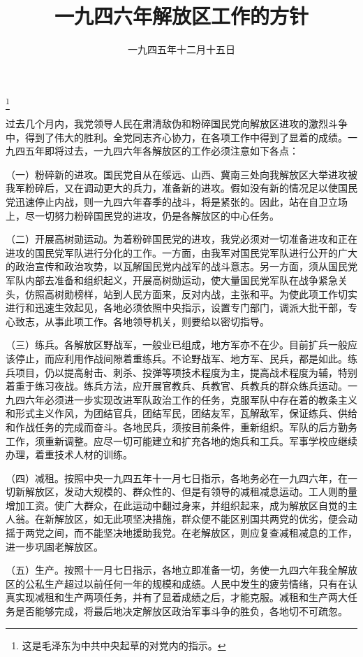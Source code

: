 
\title{一九四六年解放区工作的方针}
\date{一九四五年十二月十五日}
\thanks{这是毛泽东为中共中央起草的对党内的指示。}
\maketitle


过去几个月内，我党领导人民在肃清敌伪和粉碎国民党向解放区进攻的激烈斗争中，得到了伟大的胜利。全党同志齐心协力，在各项工作中得到了显着的成绩。一九四五年即将过去，一九四六年各解放区的工作必须注意如下各点：

（一）粉碎新的进攻。国民党自从在绥远、山西、冀南三处向我解放区大举进攻被我军粉碎后，又在调动更大的兵力，准备新的进攻。假如没有新的情况足以使国民党迅速停止内战，则一九四六年春季的战斗，将是紧张的。因此，站在自卫立场上，尽一切努力粉碎国民党的进攻，仍是各解放区的中心任务。

（二）开展高树勋运动。为着粉碎国民党的进攻，我党必须对一切准备进攻和正在进攻的国民党军队进行分化的工作。一方面，由我军对国民党军队进行公开的广大的政治宣传和政治攻势，以瓦解国民党内战军的战斗意志。另一方面，须从国民党军队内部去准备和组织起义，开展高树勋运动，使大量国民党军队在战争紧急关头，仿照高树勋榜样，站到人民方面来，反对内战，主张和平。为使此项工作切实进行和迅速生效起见，各地必须依照中央指示，设置专门部门，调派大批干部，专心致志，从事此项工作。各地领导机关，则要给以密切指导。

（三）练兵。各解放区野战军，一般业已组成，地方军亦不在少。目前扩兵一般应该停止，而应利用作战间隙着重练兵。不论野战军、地方军、民兵，都是如此。练兵项目，仍以提高射击、刺杀、投弹等项技术程度为主，提高战术程度为辅，特别着重于练习夜战。练兵方法，应开展官教兵、兵教官、兵教兵的群众练兵运动。一九四六年必须进一步实现改进军队政治工作的任务，克服军队中存在着的教条主义和形式主义作风，为团结官兵，团结军民，团结友军，瓦解敌军，保证练兵、供给和作战任务的完成而奋斗。各地民兵，须按目前条件，重新组织。军队的后方勤务工作，须重新调整。应尽一切可能建立和扩充各地的炮兵和工兵。军事学校应继续办理，着重技术人材的训练。

（四）减租。按照中央一九四五年十一月七日指示，各地务必在一九四六年，在一切新解放区，发动大规模的、群众性的、但是有领导的减租减息运动。工人则酌量增加工资。使广大群众，在此运动中翻过身来，并组织起来，成为解放区自觉的主人翁。在新解放区，如无此项坚决措施，群众便不能区别国共两党的优劣，便会动摇于两党之间，而不能坚决地援助我党。在老解放区，则应复查减租减息的工作，进一步巩固老解放区。

（五）生产。按照十一月七日指示，各地立即准备一切，务使一九四六年我全解放区的公私生产超过以前任何一年的规模和成绩。人民中发生的疲劳情绪，只有在认真实现减租和生产两项任务，并有了显着成绩之后，才能克服。减租和生产两大任务是否能够完成，将最后地决定解放区政治军事斗争的胜负，各地切不可疏忽。

